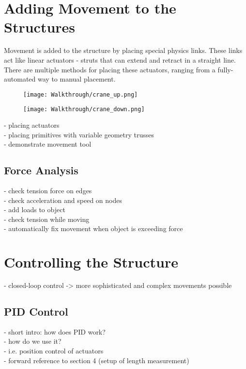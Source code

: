 \section{Adding Movement to the Structures}
Movement is added to the structure by placing special physics links. These links act like linear actuators - struts that can extend and retract in a straight line. There are multiple methods for placing these actuators, ranging from a fully-automated way to manual placement.
\begin{figure}
  \centering
  \begin{minipage}{.5\textwidth}
    \centering
    \texttt{[image: Walkthrough/crane\_up.png]}
    \label{fig:leg_asset}
  \end{minipage}%
  \begin{minipage}{.5\textwidth}
    \centering
    \texttt{[image: Walkthrough/crane\_down.png]}
    \label{fig:spider_in_progress}
  \end{minipage}
\end{figure}
- placing actuators\\
- placing primitives with variable geometry trusses\\
- demonstrate movement tool\\
\subsection{Force Analysis}
- check tension force on edges\\
- check acceleration and speed on nodes\\
- add loads to object\\
- check tension while moving\\
- automatically fix movement when object is exceeding force\\
\section{Controlling the Structure}
- closed-loop control -> more sophisticated and complex movements possible\\
\subsection{PID Control}
- short intro: how does PID work?\\
- how do we use it?\\
- i.e. position control of actuators\\
- forward reference to section 4 (setup of length measurement)\\
